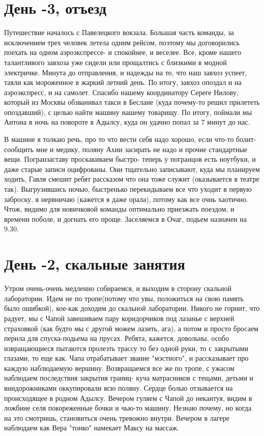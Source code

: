 \documentclass[]{article}
\begin{document}
\section{День -3, отъезд}
Путешествие началось с Павелецкого вокзала. Большая часть команды, за исключением трех человек летела одним рейсом, поэтому мы договорились поехать на одном аэроэкспрессе- и спокойнее, и веселее. Все, кроме нашего талантливого завхоза уже сидели или прощалтись с близкими в модной электричке. Минута до отправления, и надежды на то, что наш завхоз успеет, таяли как мороженное в жаркий летний день.
По итогу, завхоз опоздал и на аэроэкспресс, и на самолет. Спасибо нашему координатору Сереге Нилову, который из Москвы обзванивал такси в Беслане (куда почему-то решил прилететь опоздавший), с целью найти машину нашему товарищу.
По итогу, поймали мы Антона в ночь на повороте в Адылсу, куда он удачно попал за 7 минут до нас.

В машине я толкаю речь, про то что вести себя надо хорошо, если что-то болит- сообщить мне и медику, поляну Ахии засирать не надо и прочие стандартные вещи. Погранзаставу проскакиваем быстро- теперь у погранцов есть ноутбуки, и даже старые записи оцифрованы. Они тщательно записывают, куда мы планируем ходить, Гавля смешит ребят рассказом что она тоже служит (оказывается в театре так). Выгрузившись ночью, быстренько перекидываем все что уходит в первую заброску, я нервничаю (кажется я даже орала), потому как все очнь хаотично. Чтож, видимо для новичковой команды оптимально приезжать поездом, и времени поболе, и догнать его проще.
Заселяемся в Очаг, подьем назначен на 9.30.

\section{День -2, скальные занятия}
Утром очень-очень медленно собираемся, и выходим в сторону скальной лаборатории. Идем не по тропе(потому что увы, положиться на свою память было ошибкой), кое-как доходим до скальной лаборатории. Никого не горнит, что радует, мы с Чапой завешиваем пару коридорчиков под лазанье с верхней страховкой (как будто мы с другой можем лазить, ага), а потом и просто бросаем перила для спуска-подьема на прусах. Ребята, кажется, довольны, особо извращающиеся пытаются пролезть трассу то без одной руки, то с закрытыми глазами, то еще как. Чапа отрабатывает звание "мэстного", и рассказывает про каждую наблюдаемую вершину. Возвращаемся все же по тропе, с ужасом наблюдаем последствия закрытия границ- куча матрасников с тещами, детьми и внидорожниками оккупировали всю поляну. Сердце болью отзывается на происходящее в родном Адылсу. Вечером гуляем с Чапой до некантуя, видим в ложбине селя покореженные бочки и чью-то машину. Незнаю почему, но когда на это смотришь, становиться очень тревожно внутри.
Вечером в лагере наблюдаем как Вера "тонко" намекает Максу на массаж.
\end{document}
